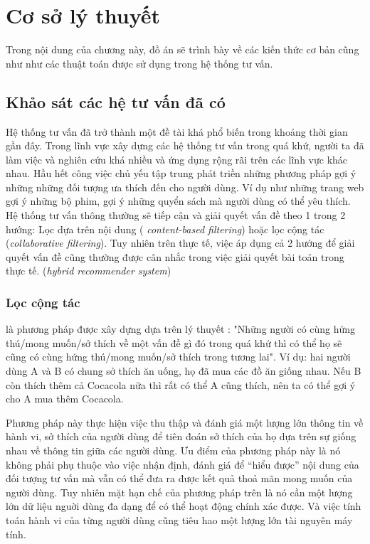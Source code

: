 
\chapter{Cơ sở lý thuyết} \label{theory-basis}

\ifpdf
    \graphicspath{{TheoryBasis/Chapter1Figs/PNG/}{TheoryBasis/Chapter1Figs/PDF/}{TheoryBasis/Chapter1Figs/}}
\else
    \graphicspath{{TheoryBasis/Chapter1Figs/EPS/}{TheoryBasis/Chapter1Figs/}}
\fi

Trong nội dung của chương này, đồ án sẽ trình bày về các kiến thức cơ bản cũng như như các thuật toán được sử dụng trong hệ thống tư vấn.
\section{Khảo sát các hệ tư vấn đã có}

Hệ thống tư vấn đã trở thành một đề tài khá phổ biến trong khoảng thời gian gần đây. Trong lĩnh vực xây dựng các hệ thống tư vấn trong quá khứ, người ta đã làm việc và nghiên cứu khá nhiều và ứng dụng rộng rãi trên các lĩnh vực khác nhau. Hầu hết công việc chủ yếu tập trung phát triền những phương pháp gợi ý những những đối tượng ưa thích đến cho người dùng. Ví dụ như những trang web gợi ý những bộ phim, gợi ý những quyển sách mà người dùng có thể yêu thích. Hệ thống tư vấn thông thường sẽ tiếp cận và giải quyết vấn đề theo 1 trong 2 hướng: Lọc dựa trên nội dung ( \textit{content-based filtering}) hoặc lọc cộng tác (\textit{collaborative filtering}). Tuy nhiên trên thực tế, việc áp dụng cả 2 hướng để giải quyết vấn đề cũng thường được cân nhắc trong việc giải quyết bài toán trong thực tế. (\textit{hybrid recommender system})

\subsection{Lọc cộng tác} là phương pháp được xây dựng dựa trên lý thuyết : "Những người có cùng hứng thú/mong muốn/sở thích về một vấn đề gì đó trong quá khứ thì có thể họ sẽ cũng có cùng hứng thú/mong muốn/sở thích trong tương lai". Ví dụ: hai người dùng A và B có chung sở thích ăn uống, họ đã mua các đồ ăn giống nhau. Nếu B còn thích thêm cả Cocacola nữa thì rất có thể A cũng thích, nên ta có thể gợi ý cho A mua thêm Cocacola. 

Phương pháp này thực hiện việc thu thập và đánh giá một lượng lớn thông tin về hành vi, sở thích của người dùng để tiên đoán sở thích của họ dựa trên sự giống nhau về thông tin giữa các người dùng. Ưu điểm của phương pháp này là nó không phải phụ thuộc vào việc nhận định, đánh giá để “hiểu được” nội dung của đối tượng tư vấn mà vẫn có thể đưa ra được kết quả thoả mãn mong muốn của người dùng. Tuy nhiên mặt hạn chế của phương pháp trên là nó cần một lượng lớn dữ liệu nguời dùng đa dạng để có thể hoạt động chính xác được. Và việc tính toán hành vi của từng người dùng cũng tiêu hao một lượng lớn tài nguyên máy tính.

